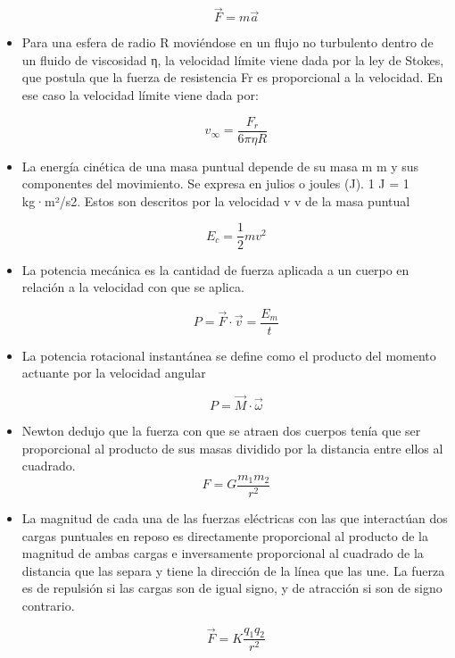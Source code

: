 \documentclass[letterpaper,12pt]{article}
\begin{document}
\begin{itemize}
                    $$\Vec{F}=m\Vec{a}$$
    
    \item [\triangleright]Para una esfera de radio R moviéndose en un flujo no turbulento dentro de un fluido de viscosidad η, la velocidad límite viene dada por la ley de Stokes, que postula que la fuerza de resistencia Fr es proporcional a la velocidad. En ese caso la velocidad límite viene dada por: 
    
                  $$v_{\infty}=\frac{F_{r}}{6\pi\eta R}$$
                  
                  
    \item[\lhd]La energía cinética de una masa puntual depende de su masa m m y sus componentes del movimiento. Se expresa en julios o joules (J). 1 J = 1 kg·m²/s2. Estos son descritos por la velocidad v v de la masa puntual
    
                  $$E_c=\frac12mv^2$$
    
    
    \item[\square]La potencia mecánica es la cantidad de fuerza aplicada a un cuerpo en relación a la velocidad con que se aplica.
     
                  $$P=\vec{F}\cdot \vec v = \dfrac{E_m}{t}$$
    
    
    \item[\hbar]La potencia rotacional instantánea se define como el producto del momento actuante por la velocidad angular 
     
                  $$P=\vec{M}\cdot \vec {\omega}$$
    
     \item[\square]Newton dedujo que la fuerza con que se atraen dos cuerpos tenía que ser proporcional al producto de sus masas dividido por la distancia entre ellos al cuadrado. 
        $$F=G \frac{m_{1}m_{2}}{r^{2}}$$

    \item[\lhd]La magnitud de cada una de las fuerzas eléctricas con las que interactúan dos cargas puntuales en reposo es directamente proporcional al producto de la magnitud de ambas cargas e inversamente proporcional al cuadrado de la distancia que las separa y tiene la dirección de la línea que las une. La fuerza es de repulsión si las cargas son de igual signo, y de atracción si son de signo contrario.
    
    
    $$\vec{F}=K \frac{q_{1} q_{2}}{r^{2}}$$





\end{itemize}
\end{document}
